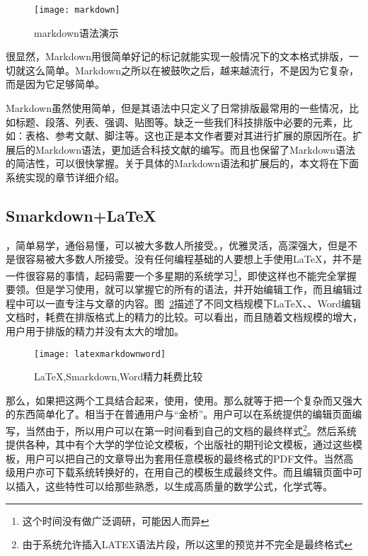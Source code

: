 \begin{figure}[H]
  \centering
  \texttt{[image: markdown]}
  \caption{markdown语法演示}
  \label{fig:xfiga1}
\end{figure}
很显然，Markdown用很简单好记的标记就能实现一般情况下的文本格式排版，一切就这么简单。Markdown之所以在被鼓吹之后，越来越流行，不是因为它复杂，而是因为它足够简单。

Markdown虽然使用简单，但是其语法中只定义了日常排版最常用的一些情况，比如标题、段落、列表、强调、贴图等。缺乏一些我们科技排版中必要的元素，比如：表格、参考文献、脚注等。这也正是本文作者要对其进行扩展的原因所在。扩展后的Markdown语法，更加适合科技文献的编写。而且也保留了Markdown语法的简洁性，可以很快掌握。关于具体的Markdown语法和扩展后的，本文将在下面系统实现的章节详细介绍。

\subsection{Smarkdown+\LaTeX}
\label{sec:sandl}

，简单易学，通俗易懂，可以被大多数人所接受。，优雅灵活，高深强大，但是不是很容易被大多数人所接受。没有任何编程基础的人要想上手使用\LaTeX，并不是一件很容易的事情，起码需要一个多星期的系统学习\footnote{这个时间没有做广泛调研，可能因人而异}，即使这样也不能完全掌握要领。但是学习使用，就可以掌握它的所有的语法，并开始编辑工作，而且编辑过程中可以一直专注与文章的内容。图~\ref{fig:xfig7}描述了不同文档规模下\LaTeX、\smarkdown、Word编辑文档时，耗费在排版格式上的精力的比较。可以看出，而且随着文档规模的增大，用户用于排版的精力并没有太大的增加。
\begin{figure}[H]
  \centering
  \texttt{[image: latexmarkdownword]}
  \caption{LaTeX,Smarkdown,Word精力耗费比较}
  \label{fig:xfig7}
\end{figure}
那么，如果把这两个工具结合起来，使用，使用。那么就等于把一个复杂而又强大的东西简单化了。相当于在普通用户与“金桥”。用户可以在系统提供的编辑页面编写，当然由于，所以用户可以在第一时间看到自己的文档的最终样式\footnote{由于系统允许插入LATEX语法片段，所以这里的预览并不完全是最终格式}。然后系统提供各种，其中有个大学的学位论文模板，个出版社的期刊论文模板，通过这些模板，用户可以把自己的文章导出为套用任意模板的最终格式的PDF文件。当然高级用户亦可下载系统转换好的，在用自己的模板生成最终文件。而且编辑页面中可以插入，这些特性可以给那些熟悉，以生成高质量的数学公式，化学式等。

